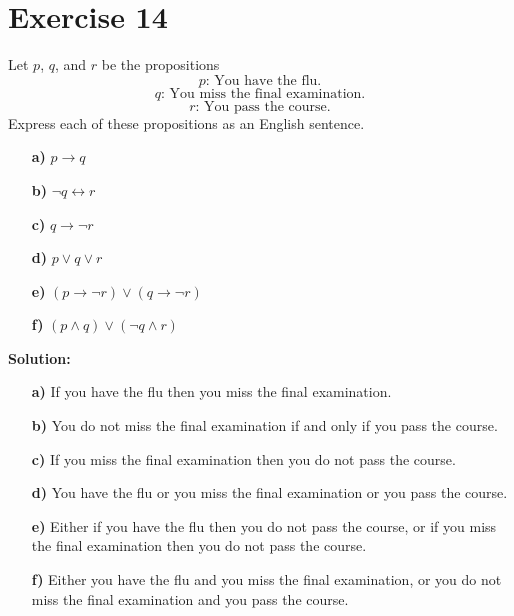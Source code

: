 \documentclass{Axon}
\begin{document}
\section*{Exercise 14}
Let \(p\), \(q\), and \(r\) be the propositions
\begin{equation}
    p\text{: You have the flu.}
\end{equation}
\begin{equation}
    q\text{: You miss the final examination.}
\end{equation}
\begin{equation}
    r\text{: You pass the course.}
\end{equation}
Express each of these propositions as an English sentence.
\begin{enumerate}
    \item[\textbf{a)}] \(p \to q\)
    \item[\textbf{b)}] \(\lnot q \leftrightarrow r\)
    \item[\textbf{c)}] \(q \to \lnot r\)
    \item[\textbf{d)}] \(p \lor q \lor r\)
    \item[\textbf{e)}] \((p \to \lnot r) \lor (q \to \lnot r)\)
    \item[\textbf{f)}] \((p \land q) \lor (\lnot q \land r)\)
\end{enumerate}

\noindent
\textbf{Solution:}
\begin{enumerate}
    \item[\textbf{a)}] If you have the flu then you miss the final examination.
    \item[\textbf{b)}] You do not miss the final examination if and only if you pass the course.
    \item[\textbf{c)}] If you miss the final examination then you do not pass the course.
    \item[\textbf{d)}] You have the flu or you miss the final examination or you pass the course.
    \item[\textbf{e)}] Either if you have the flu then you do not pass the course, or if you miss the final examination then you do not pass the course.
    \item[\textbf{f)}] Either you have the flu and you miss the final examination, or you do not miss the final examination and you pass the course.
\end{enumerate}
\end{document}
